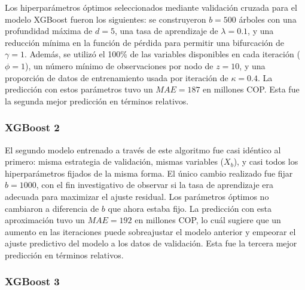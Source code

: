 \documentclass[article,11 pt]{article}
\begin{document}
Los hiperparámetros óptimos seleccionados mediante validación cruzada para el modelo XGBoost fueron los siguientes: se construyeron \( b = 500 \) árboles con una profundidad máxima de \( d = 5 \), una tasa de aprendizaje de \( \lambda = 0{.}1 \), y una reducción mínima en la función de pérdida para permitir una bifurcación de \( \gamma = 1 \). Además, se utilizó el 100\% de las variables disponibles en cada iteración (\( \phi = 1 \)), un número mínimo de observaciones por nodo de \( z = 10 \), y una proporción de datos de entrenamiento usada por iteración de \( \kappa = 0{.}4 \). La predicción con estos parámetros tuvo un $MAE= 187$ en millones COP. Esta fue la segunda mejor predicción en términos relativos.

\subsubsection{XGBoost 2}

El segundo modelo entrenado a través de este algoritmo fue casi idéntico al primero: misma estrategia de validación, mismas variables (${X}_b$), y casi todos los hiperparámetros fijados de la misma forma. El único cambio realizado fue fijar $b=1000$, con el fin investigativo de observar si la tasa de aprendizaje era adecuada para maximizar el ajuste residual. Los parámetros óptimos no cambiaron a diferencia de $b$ que ahora estaba fijo. La predicción con esta aproximación tuvo un $MAE= 192$ en millones COP, lo cuál sugiere que un aumento en las iteraciones puede sobreajustar el modelo anterior y empeorar el ajuste predictivo del modelo a los datos de validación. Esta fue la tercera mejor predicción en términos relativos.

\subsubsection{XGBoost 3}
\end{document}
